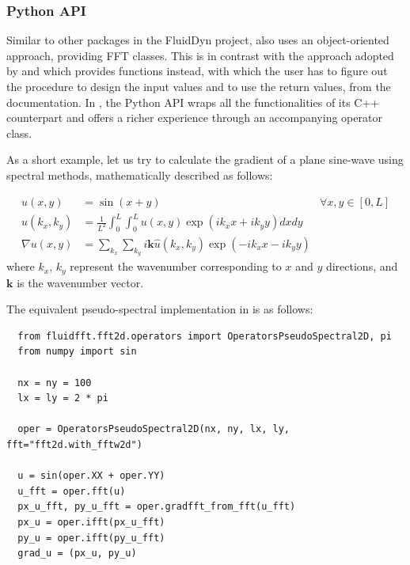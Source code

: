 \subsubsection{Python API} Similar to other packages in the FluidDyn project,
 also uses an object-oriented approach, providing FFT classes.
%
This is in contrast with the approach adopted by  and  which provides functions instead, with which the user has to
figure out the procedure to design the input values and to use the return
values, from the documentation.
%
In , the Python API wraps all the functionalities of its C++
counterpart and offers a richer experience through an accompanying
operator class.

As a short example, let us try to calculate the gradient of a plane sine-wave
using spectral methods, mathematically described as follows:

\begin{align*}
  u(x,y) &=
    \sin(x + y) &\forall x,y \in \left[0, L \right] \\
  \hat u(k_x,k_y) &=
    \frac{1}{L^2}
    \int_0^{L}\int_0^{L}
    u(x,y) \exp(ik_x x + ik_y y) dx dy \\
  \nabla u(x,y) &=
    \sum_{k_x} \sum_{k_y}
    i\mathbf{k}
    \hat u(k_x,k_y) \exp(-ik_x x - ik_y y)
\end{align*}
%
where $k_x$, $k_y$ represent the wavenumber corresponding to $x$ and $y$ directions,
and $\mathbf{k}$ is the wavenumber vector.

The equivalent pseudo-spectral implementation in  is as follows:
\begin{verbatim}
  from fluidfft.fft2d.operators import OperatorsPseudoSpectral2D, pi
  from numpy import sin

  nx = ny = 100
  lx = ly = 2 * pi

  oper = OperatorsPseudoSpectral2D(nx, ny, lx, ly, fft="fft2d.with_fftw2d")

  u = sin(oper.XX + oper.YY)
  u_fft = oper.fft(u)
  px_u_fft, py_u_fft = oper.gradfft_from_fft(u_fft)
  px_u = oper.ifft(px_u_fft)
  py_u = oper.ifft(py_u_fft)
  grad_u = (px_u, py_u)
\end{verbatim}

